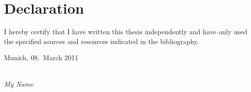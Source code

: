 \clearpage
\pagestyle{empty}
\renewcommand*{\chapterpagestyle}{empty}
\chapter*{Declaration}




\vspace*{2cm}
\noindent

I hereby certify that I have written this thesis independently and have only used the specified sources and resources indicated in the bibliography.

\vspace{2cm}

\noindent
Munich, 08.\, March 2011 %

\vspace{3cm}

\hspace*{7cm}%
\dotfill\\
\hspace*{8.5cm}%
\textit{My Name}